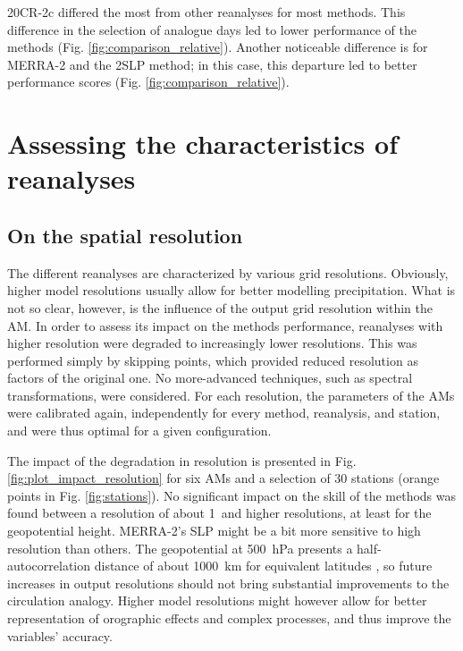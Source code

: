 \documentclass[smallextended]{svjour3}       %
\begin{document}
	20CR-2c differed the most from other reanalyses for most methods. This difference in the selection of analogue days led to lower performance of the methods (Fig. \ref{fig:comparison_relative}). Another noticeable difference is for MERRA-2 and the 2SLP method; in this case, this departure led to better performance scores (Fig. \ref{fig:comparison_relative}).
	
	
	\section{Assessing the characteristics of reanalyses}
	\label{sec:analyzes}
	
	\subsection{On the spatial resolution}
	\label{sec:resolution}
	
	The different reanalyses are characterized by various grid resolutions. Obviously, higher model resolutions usually allow for better modelling precipitation. What is not so clear, however, is the influence of the output grid resolution within the AM. In order to assess its impact on the methods performance, reanalyses with higher resolution were degraded to increasingly lower resolutions. This was performed simply by skipping points, which provided reduced resolution as factors of the original one. No more-advanced techniques, such as spectral transformations, were considered. For each resolution, the parameters of the AMs were calibrated again, independently for every method, reanalysis, and station, and were thus optimal for a given configuration. 
	
	The impact of the degradation in resolution is presented in Fig. \ref{fig:plot_impact_resolution} for six AMs and a selection of 30 stations (orange points in Fig. \ref{fig:stations}). No significant impact on the skill of the methods was found between a resolution of about 1\degree\ and higher resolutions, at least for the geopotential height. MERRA-2's SLP might be a bit more sensitive to high resolution than others. The geopotential at 500~hPa presents a half-autocorrelation distance of about 1000~km for equivalent latitudes \citep{Thiebaux1985}, so future increases in output resolutions should not bring substantial improvements to the circulation analogy. Higher model resolutions might however allow for better representation of orographic effects and complex processes, and thus improve the variables' accuracy. 
	
\end{document}
